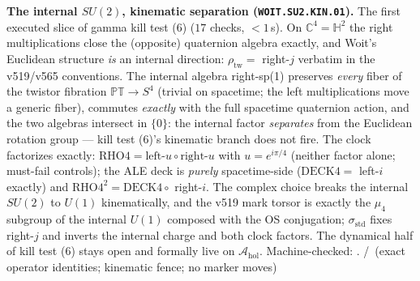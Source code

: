 \par\smallskip\noindent\textbf{The internal $SU(2)$, kinematic
separation (\texttt{WOIT.SU2.KIN.01}).}
The first executed slice of gamma kill test (6) ($17$ checks,
${<}1$\,s).  On $\mathbb{C}^4=\mathbb{H}^2$ the right multiplications
close the (opposite) quaternion algebra exactly, and Woit's Euclidean
structure \emph{is} an internal direction:
$\rho_{\mathrm{tw}}=$ right-$j$ verbatim in the v519/v565
conventions.  The internal algebra right-sp(1) preserves \emph{every}
fiber of the twistor fibration $\mathbb{PT}\to S^4$ (trivial on
spacetime; the left multiplications move a generic fiber), commutes
\emph{exactly} with the full spacetime quaternion action, and the two
algebras intersect in $\{0\}$: the internal factor \emph{separates}
from the Euclidean rotation group --- kill test (6)'s kinematic
branch does not fire.  The clock factorizes exactly:
$\mathrm{RHO4}=\mathrm{left}\text{-}u\circ\mathrm{right}\text{-}u$
with $u=e^{i\pi/4}$ (neither factor alone; must-fail controls); the
ALE deck is \emph{purely} spacetime-side ($\mathrm{DECK4}=$ left-$i$
exactly) and $\mathrm{RHO4}^2=\mathrm{DECK4}\circ$ right-$i$.  The
complex choice breaks the internal $SU(2)$ to $U(1)$ kinematically,
and the v519 mark torsor is exactly the $\mu_4$ subgroup of the
internal $U(1)$ composed with the OS conjugation;
$\sigma_{\mathrm{std}}$ fixes right-$j$ and inverts the internal
charge and both clock factors.  The dynamical half of kill test (6)
stays open and formally live on $\mathcal A_{\mathrm{hol}}$.
Machine-checked: .
\mE/\mC\ (exact operator identities; kinematic fence; no marker moves)
\par\smallskip

